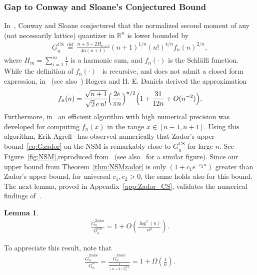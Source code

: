 \documentclass[article,doublecolumn]{IEEEtran}
\newcommand{\df}{{\, \stackrel{\mathrm{def}}{=}\, }}
\newcommand{\R}{{\mathbb{R}}}
\newtheorem{lem}[thm]{Lemma}
\begin{document}
\subsubsection{Gap to Conway and Sloane's Conjectured Bound}
\label{subsec:CSZador}

In~\cite{conway1985lower}, Conway and Sloane conjectured that the normalized second moment of any (not necessarily lattice) quantizer in $\R^n$  is lower bounded by
\begin{align}
\underline{G}^{\mathrm{CS}}_n\df     \frac{n+3-2H_{n+2}}{4n(n+1)}(n+1)^{1/n}(n!)^{4/n} f_n(n)^{2/n},
\label{eq:CSlb}
\end{align}
where $H_m=\sum_{i=1}^m\frac{1}{i}$ is a harmonic sum, and  $f_n(\cdot)$ is the Schl\"afli function. While the definition of $f_n(\cdot)$~\cite{conway1985lower} is recursive, and does not admit a closed form expression, in~\cite{rogers1958packing} (see also~\cite{rogers1961asymptotic,Shoom24}) Rogers and H. E. Daniels derived the approximation
\begin{align}\label{eq:rogers}
f_n(n)=\frac{\sqrt{n+1}}{\sqrt{2}\,e\,n!}\Bigl(\frac{2e}{\pi n}\Bigr)^{n/2}
\Bigl(1+\frac{31}{12n}+O(n^{-2})\Bigr).
\end{align}
Furthermore, in~\cite{Shoom24} an efficient  algorithm with high numerical precision was developed for computing $f_n(x)$ in the range $x\in[n-1,n+1]$. Using this algorithm, Erik Agrell~\cite{agrell2025personal} has observed numerically that Zador's upper bound~\eqref{eq:Gzador} on the NSM is remarkably close to $\underline{G}^{\mathrm{CS}}_n$ for large $n$. See Figure~\ref{fig:NSM},reproduced from~\cite{agrell2025personal} (see also~\cite[Figure 1]{allen2022performance} for a similar figure). Since our upper bound from Theorem~\ref{thm:NSMzador} is only $(1+c_1 e^{-c_2n})$ greater than Zador's upper bound, for universal $c_1,c_2>0$, the same holds also for this bound. The next lemma, proved in Appendix~\ref{app:Zador_CS}, validates the numerical findings of~\cite{agrell2025personal}.
\begin{lem}
\begin{align}
\frac{\overline{G}_n^{\mathrm{Zador}}}{\underline{G}^{\mathrm{CS}}_n}=1+O\left(\frac{\log^2(n)}{n^2}\right).   
\end{align}    
\label{lem:ZadorVsCS}
\end{lem}
To appreciate this result, note that
\begin{align}
 \frac{\overline{G}_n^{\mathrm{Zador}}}{G_n^*}=\frac{\overline{G}_n^{\mathrm{Zador}}}{\frac{1}{(n+2)V_n^{2/n}}}=1+\Omega\left(\frac{1}{n}\right).   
\end{align}    
\end{document}
